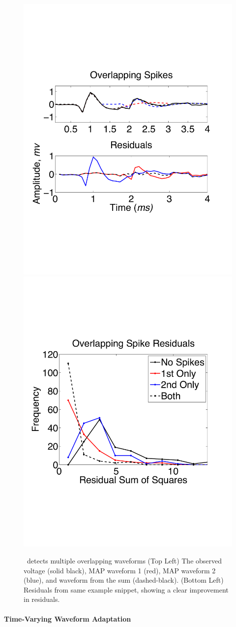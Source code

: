 \begin{center}
\begin{figure}
\includegraphics[width=.28\textwidth]{../figs/alloverlappingspikes/olspike3}
\includegraphics[width=.28\textwidth]{../figs/overlappingstatv2.pdf}
\vspace{-.1in}
\caption{\smug\ detects multiple overlapping waveforms (Top Left) The observed voltage (solid black), MAP waveform 1 (red), MAP waveform 2 (blue), and waveform from the sum (dashed-black). (Bottom Left) Residuals from same example snippet, showing a clear improvement in residuals.  %
    } \label{fig:overlapping}
\end{figure}
\end{center}


\vspace{-10pt}
\vspace{-.1in}
\paragraph{Time-Varying Waveform Adaptation} \label{sub:adapt}


